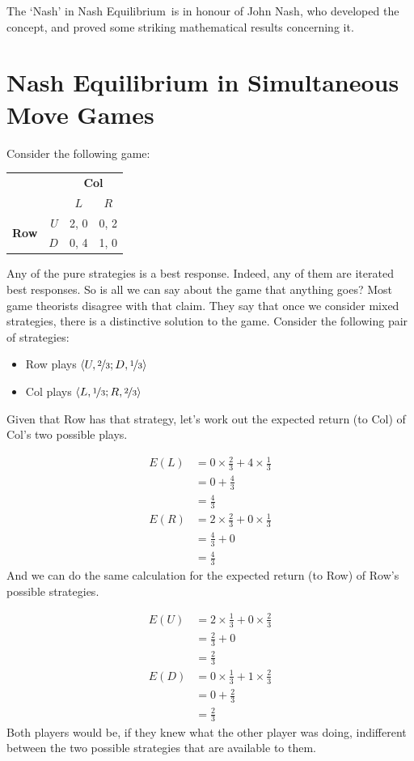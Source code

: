 \documentclass[openany]{book}
\newcommand{\Eqm}{Equilibrium}
\begin{document}
\noindent The `Nash' in Nash \Eqm\ is in honour of John Nash, who developed the concept, and proved some striking mathematical results concerning it.

\section{Nash Equilibrium in Simultaneous Move Games}

Consider the following game:

\begin{center}
\begin{tabular}{l r | c c}
& & \multicolumn{2}{c}{\textbf{Col}} \\
& & $L$ & $R$ \\ \hline
\multirow{2}{*}{\textbf{Row}} & $U$ & 2, 0 & 0, 2 \\
& $D$ & 0, 4 & 1, 0
\end{tabular}
\end{center}
Any of the pure strategies is a best response. Indeed, any of them are iterated best responses. So is all we can say about the game that anything goes? Most game theorists disagree with that claim. They say that once we consider mixed strategies, there is a distinctive solution to the game. Consider the following pair of strategies:

\begin{itemize}
\item Row plays $\langle U, \nicefrac{2}{3}; D, \nicefrac{1}{3} \rangle$
\item Col plays $\langle L, \nicefrac{1}{3}; R, \nicefrac{2}{3} \rangle$
\end{itemize}
Given that Row has that strategy, let's work out the expected return (to Col) of Col's two possible plays.

\begin{align*}
E(L) &= 0 \times \frac{2}{3} + 4 \times \frac{1}{3} \\
&= 0 + \frac{4}{3} \\
&= \frac{4}{3} \\
E(R) &= 2 \times \frac{2}{3} + 0 \times \frac{1}{3} \\
&= \frac{4}{3} + 0 \\
&= \frac{4}{3} 
\end{align*}
And we can do the same calculation for the expected return (to Row) of Row's possible strategies.

\begin{align*}
E(U) &= 2 \times \frac{1}{3} + 0 \times \frac{2}{3} \\
&= \frac{2}{3} + 0\\
&= \frac{2}{3} \\
E(D) &= 0 \times \frac{1}{3} + 1 \times \frac{2}{3} \\
&= 0 + \frac{2}{3} \\
&= \frac{2}{3} 
\end{align*}
Both players would be, if they knew what the other player was doing, indifferent between the two possible strategies that are available to them.
\end{document}
